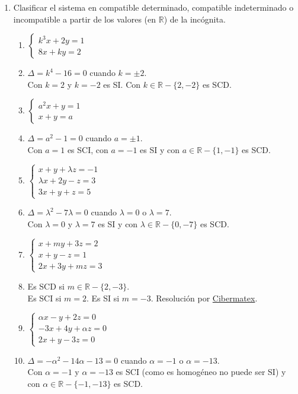 \documentclass[a4paper]{article}
\newcommand{\answer}{\item[**]}
\newcommand{\exercise}{\item}
\begin{document}
\begin{enumerate}
\begin{multicols}{3}
\begin{enumerate} [label=(\alph*)]
	\end{enumerate}
	\end{multicols}

	\exercise Clasificar el sistema en compatible determinado, compatible indeterminado o incompatible a partir de los valores (en $\mathbb{R}$) de la incógnita.
	\begin{multicols}{3}
	\begin{enumerate} [label=(\alph*)]

		\item $\left\{\begin{matrix} k^3x+2y=1 \\ 8x+ky=2 \end{matrix}\right.$
		\answer $\Delta=k^4-16=0$ cuando $k=\pm 2$. \\Con $k=2$ y $k=-2$ es SI. Con $k\in\mathbb{R}-\{2,-2\}$ es SCD.

		\item $\left\{\begin{matrix} a^2x+y=1 \\ x+y=a \end{matrix}\right.$
		\answer $\Delta=a^2-1=0$ cuando $a=\pm 1$. \\Con $a=1$ es SCI, con $a=-1$ es SI y con $a\in\mathbb{R}-\{1,-1\}$ es SCD.

		\item $\left\{\begin{matrix} x+y+\lambda z=-1 \\ \lambda x+2y-z=3 \\ 3x+y+z=5 \end{matrix}\right.$
		\answer $\Delta=\lambda^2-7\lambda=0$ cuando $\lambda=0$ o $\lambda=7$. \\Con $\lambda=0$ y $\lambda=7$ es SI y con $\lambda\in\mathbb{R}-\{0,-7\}$ es SCD.

		\item $\left\{\begin{matrix} x+my+3z=2 \\ x+y-z=1 \\ 2x+3y+mz=3 \end{matrix}\right.$
		\answer Es SCD si $m\in \mathbb{R}-\{2,-3\}$. \\ Es SCI si $m=2$. Es SI si $m=-3$. Resolución por \href{https://youtu.be/jKLkTVmpmSk}{Cibermatex}.

		\item $\left\{\begin{matrix} \alpha x-y+2z=0 \\ -3x+4y+\alpha z=0 \\ 2x+y-3z=0 \end{matrix}\right.$
		\answer $\Delta=-\alpha^2-14\alpha-13=0$ cuando $\alpha=-1$ o $\alpha=-13$. \\Con $\alpha=-1$ y $\alpha=-13$ es SCI (como es homogéneo no puede ser SI) y con $\alpha\in\mathbb{R}-\{-1,-13\}$ es SCD.


\end{enumerate}
\end{multicols}
\end{enumerate}
\end{document}
